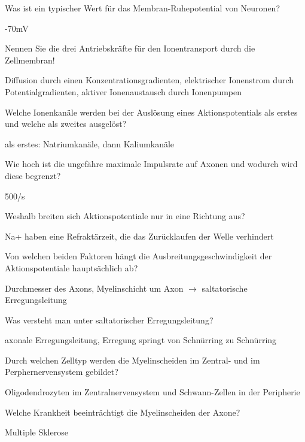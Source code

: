 \documentclass[10pt, a4paper]{exam}
\begin{document}
\begin{questions}
  \question Was ist ein typischer Wert für das Membran-Ruhepotential von Neuronen?
  \begin{solution}
    -70mV
  \end{solution}

  \question Nennen Sie die drei Antriebskräfte für den Ionentransport durch die Zellmembran!
  \begin{solution}
    Diffusion durch einen Konzentrationsgradienten, elektrischer Ionenstrom durch Potentialgradienten, aktiver Ionenaustausch durch Ionenpumpen
  \end{solution}

  \question Welche Ionenkanäle werden bei der Auslösung eines Aktionspotentials als erstes und welche als zweites ausgelöst?
  \begin{solution}
    als erstes: Natriumkanäle, dann Kaliumkanäle
  \end{solution}

  \question Wie hoch ist die ungefähre maximale Impulsrate auf Axonen und wodurch wird diese begrenzt?
  \begin{solution}
    500/s
  \end{solution}

  \question Weshalb breiten sich Aktionspotentiale nur in eine Richtung aus?
  \begin{solution}
    Na+ haben eine Refraktärzeit, die das Zurücklaufen der Welle verhindert
  \end{solution}

  \question Von welchen beiden Faktoren hängt die Ausbreitungsgeschwindigkeit der Aktionspotentiale hauptsächlich ab?
  \begin{solution}
    Durchmesser des Axons, Myelinschicht um Axon $\rightarrow$ saltatorische Erregungsleitung
  \end{solution}

  \question Was versteht man unter saltatorischer Erregungsleitung?
  \begin{solution}
    axonale Erregungsleitung, Erregung springt von Schnürring zu Schnürring
  \end{solution}

  \question Durch welchen Zelltyp werden die Myelinscheiden im Zentral- und im Perphernervensystem gebildet?
  \begin{solution}
    Oligodendrozyten im Zentralnervensystem und Schwann-Zellen in der Peripherie
  \end{solution}

  \question Welche Krankheit beeinträchtigt die Myelinscheiden der Axone?
  \begin{solution}
    Multiple Sklerose
  \end{solution}


\end{questions}
\end{document}
